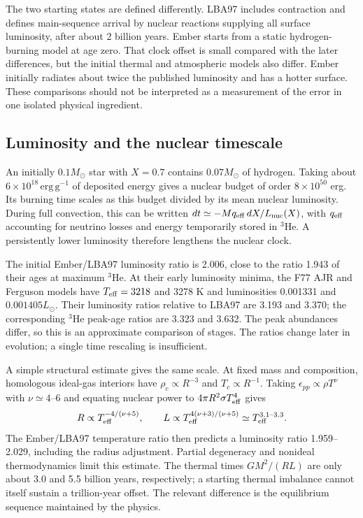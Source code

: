 \documentclass[11pt,letterpaper]{article}
\newcommand{\Ms}{M_\odot}\newcommand{\Rs}{R_\odot}\newcommand{\Ls}{L_\odot}
\begin{document}
The two starting states are defined differently. LBA97 includes contraction
and defines main-sequence arrival by nuclear reactions supplying all surface
luminosity, after about 2 billion years. Ember starts from a static
hydrogen-burning model at age zero. That clock offset is small compared with
the later differences, but the initial thermal and atmospheric models also
differ. Ember initially radiates about twice the published luminosity and
has a hotter surface. These comparisons should not be interpreted as a
measurement of the error in one isolated physical ingredient.


\subsection{Luminosity and the nuclear timescale}
An initially $0.1\Ms$ star with $X=0.7$ contains $0.07\Ms$ of hydrogen.
Taking about $6\times10^{18}\,\mathrm{erg\,g^{-1}}$ of deposited energy gives
a nuclear budget of order $8\times10^{50}$ erg. Its burning time scales as
this budget divided by its mean nuclear luminosity. During full convection,
this can be written $dt\simeq-M q_{\rm eff}\,dX/L_{\rm nuc}(X)$, with
$q_{\rm eff}$ accounting for neutrino losses and energy temporarily stored
in $^3$He. A persistently lower luminosity therefore lengthens the nuclear clock.

The initial Ember/LBA97 luminosity ratio is 2.006, close to the ratio 1.943
of their ages at maximum $^3$He. At their early luminosity minima, the F77
AJR and Ferguson models have $T_{\rm eff}=3218$ and 3278 K and luminosities
0.001331 and $0.001405\Ls$. Their luminosity ratios relative to LBA97 are
3.193 and 3.370; the corresponding $^3$He peak-age ratios are 3.323 and 3.632.
The peak abundances differ, so this is an approximate comparison of stages.
The ratios change later in evolution; a single time rescaling is insufficient.

A simple structural estimate gives the same scale. At fixed mass and
composition, homologous ideal-gas interiors have $\rho_c\propto R^{-3}$
and $T_c\propto R^{-1}$. Taking $\epsilon_{pp}\propto\rho T^\nu$ with
$\nu\simeq4$--6 and equating nuclear power to
$4\pi R^2\sigma T_{\rm eff}^4$ gives
\[
R\propto T_{\rm eff}^{-4/(\nu+5)},\qquad
L\propto T_{\rm eff}^{4(\nu+3)/(\nu+5)}
\simeq T_{\rm eff}^{3.1\text{--}3.3}.
\]
The Ember/LBA97 temperature ratio then predicts a luminosity ratio
1.959--2.029, including the radius adjustment. Partial degeneracy and
nonideal thermodynamics limit this estimate. The thermal times
$GM^2/(RL)$ are only about 3.0 and 5.5 billion years, respectively;
a starting thermal imbalance cannot itself sustain a trillion-year offset.
The relevant difference is the equilibrium sequence maintained by the physics.
\end{document}
